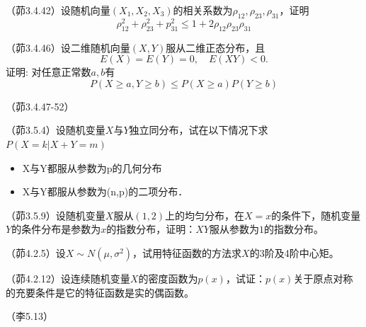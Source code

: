 \begin{problemset}[错题记录]
    \item （茆3.4.42）设随机向量$(X_1,X_2,X_3)$的相关系数为$\rho_{12},\rho_{23},\rho_{31}$，证明
    \[ \rho_{12}^{2}+\rho_{23}^{2}+p_{31}^{2} \le 1+2 \rho_{12} \rho_{23} \rho_{31} \]
    \item （茆3.4.46）设二维随机向量$(X,Y)$服从二维正态分布，且
    \[ E(X)=E(Y)=0, \quad E(X Y)<0. \]
    证明: 对任意正常数$a,b$有
    \[ P(X \ge a, Y \ge b) \le P(X \ge a) P(Y \ge b) \]
    \item （茆3.4.47-52）
    \item （茆3.5.4）设随机变量$X$与$Y$独立同分布，试在以下情况下求$P(X=k|X+Y=m)$
    \begin{itemize}
        \item X与Y都服从参数为p的几何分布
        \item X与Y都服从参数为(n,p)的二项分布．
    \end{itemize}
    \item （茆3.5.9）设随机变量$X$服从$(1,2)$上的均匀分布，在$X=x$的条件下，随机变量$Y$的条件分布是参数为$x$的指数分布，证明：$XY$服从参数为$1$的指数分布。
    \item （茆4.2.5）设$X \sim N ( \mu, \sigma^2 )$，试用特征函数的方法求$X$的3阶及4阶中心矩。
    \item （茆4.2.12）设连续随机变量$X$的密度函数为$p(x)$，试证：$p (x)$关于原点对称的充要条件是它的特征函数是实的偶函数。
    \item （李5.13）
\end{problemset}
